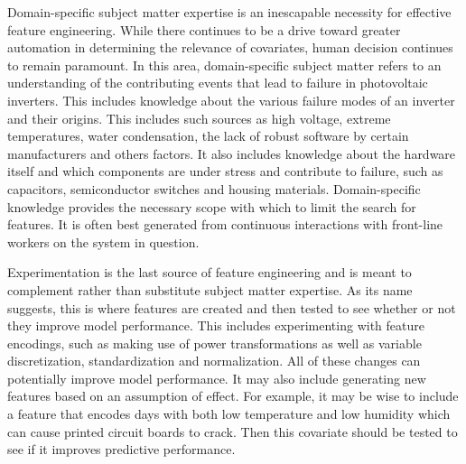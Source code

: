 Domain-specific subject matter expertise is an inescapable necessity for effective feature engineering. While there continues to be a drive toward greater automation in determining the relevance of covariates, human decision continues to remain paramount. In this area, domain-specific subject matter refers to an understanding of the contributing events that lead to failure in photovoltaic inverters. This includes knowledge about the various failure modes of an inverter and their origins. This includes such sources as high voltage, extreme temperatures, water condensation, the lack of robust software by certain manufacturers and others factors. It also includes knowledge about the hardware itself and which components are under stress and contribute to failure, such as capacitors, semiconductor switches and housing materials\cite{Flicker2014}. Domain-specific knowledge provides the necessary scope with which to limit the search for features. It is often best generated from continuous interactions with front-line workers on the system in question.

Experimentation is the last source of feature engineering and is meant to complement rather than substitute subject matter expertise. As its name suggests, this is where features are created and then tested to see whether or not they improve model performance. This includes experimenting with feature encodings, such as making use of power transformations as well as variable discretization, standardization and normalization. All of these changes can potentially improve model performance. It may also include generating new features based on an assumption of effect. For example, it may be wise to include a feature that encodes days with both low temperature and low humidity which can cause printed circuit boards to crack. Then this covariate should be tested to see if it improves predictive performance. 

